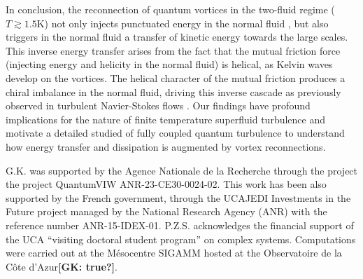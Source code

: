 \documentclass[%
 reprint,
 amsmath,amssymb,
 aps,
 prl,
]{revtex4-2}
\newcommand*{\NOTE}[1]{\textbf{\color{red}[#1]}}
\begin{document}
In conclusion, the reconnection of quantum vortices in the two-fluid regime
($T\gtrsim 1.5$K) not only injects punctuated
energy in the normal fluid \cite{stasiak2024quantum}, but also triggers in the normal fluid
a transfer of kinetic energy towards the large scales. This inverse 
energy transfer arises from the fact that the mutual friction force (injecting energy and 
helicity in the normal fluid) is helical, as Kelvin waves develop on the vortices.
The helical character of the mutual friction produces a chiral imbalance in the normal fluid, driving this inverse cascade as previously observed in turbulent Navier-Stokes flows
\cite{biferaleInverseEnergyCascade2012a,plunianInverseCascadeEnergy2020a}.
Our findings have profound implications for the nature of finite temperature superfluid turbulence and motivate a detailed studied of fully coupled quantum turbulence to understand how energy transfer and dissipation is augmented by vortex reconnections.




\begin{acknowledgments}
    G.K. was supported by the Agence Nationale de la Recherche through the project the project QuantumVIW ANR-23-CE30-0024-02.
    This work has been also supported by the French government, through the UCAJEDI Investments in the Future project managed by the National Research Agency (ANR) with the reference number ANR-15-IDEX-01. P.Z.S. acknowledges the financial support of the UCA ``visiting doctoral student program'' on complex systems. Computations were carried out at the Mésocentre SIGAMM hosted at the Observatoire de la Côte d’Azur\NOTE{GK: true?}.

  \end{acknowledgments}


\end{document}
